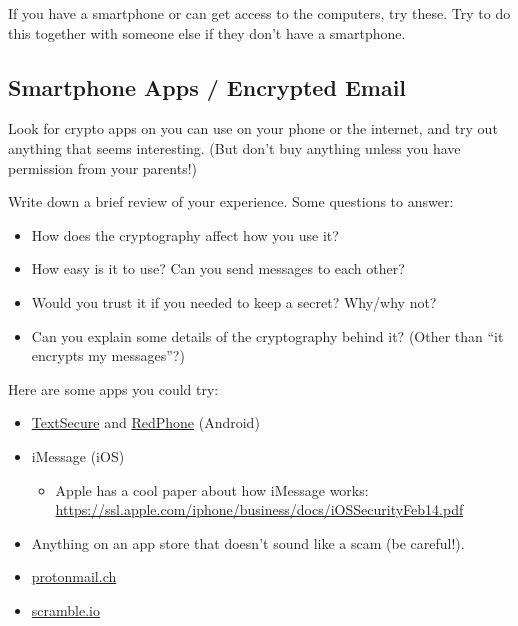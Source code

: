 \documentclass[12pt]{article}
\begin{document}
If you have a smartphone or can get access to the computers, try these. Try to do this together with someone else if they don't have a smartphone.

\subsection*{Smartphone Apps / Encrypted Email}

Look for crypto apps on you can use on your phone or the internet, and try out anything that seems interesting. (But don't buy anything unless you have permission from your parents!)

Write down a brief review of your experience. Some questions to answer:

\begin{itemize}
\item How does the cryptography affect how you use it?
\item How easy is it to use? Can you send messages to each other?
\item Would you trust it if you needed to keep a secret? Why/why not?
\item Can you explain some details of the cryptography behind it? (Other than ``it encrypts my messages''?)
\end{itemize}



\vspace{2em}
Here are some apps you could try:

\begin{itemize}
\item \href{https://whispersystems.org/}{TextSecure} and \href{https://whispersystems.org/}{RedPhone} (Android)
\item iMessage (iOS)
\begin{itemize}
\item Apple has a cool paper about how iMessage works:\\\href{https://ssl.apple.com/iphone/business/docs/iOS_Security_Feb14.pdf}{https://ssl.apple.com/iphone/business/docs/iOS{\textunderscore}Security{\textunderscore}Feb14.pdf}
\end{itemize}
\item Anything on an app store that doesn't sound like a scam (be careful!).
\item \href{https://protonmail.ch/}{protonmail.ch}
\item \href{https://protonmail.ch/}{scramble.io}
\end{itemize}
\end{document}
